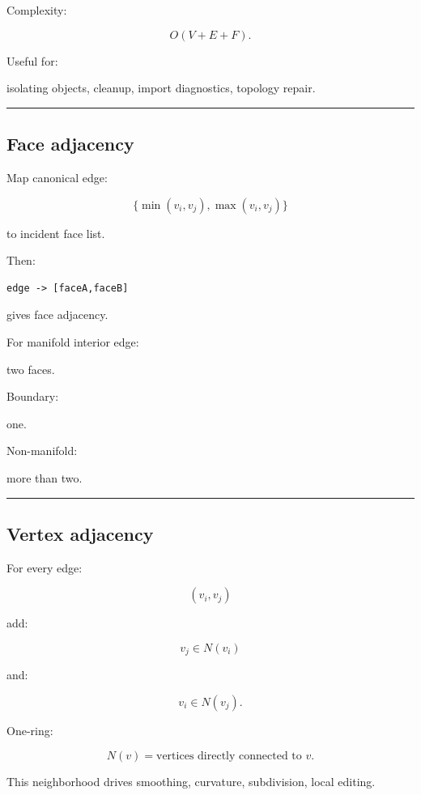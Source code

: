 Complexity:

\[
O(V+E+F).
\]

Useful for:

isolating objects, cleanup, import diagnostics, topology repair.

\begin{center}\rule{0.5\linewidth}{0.5pt}\end{center}

\subsection{Face adjacency}\label{04-visual-computing-ii-ch041-face-adjacency}

Map canonical edge:

\[
\{\min(v_i,v_j),\max(v_i,v_j)\}
\]

to incident face list.

Then:

\begin{verbatim}
edge -> [faceA,faceB]
\end{verbatim}

gives face adjacency.

For manifold interior edge:

two faces.

Boundary:

one.

Non-manifold:

more than two.

\begin{center}\rule{0.5\linewidth}{0.5pt}\end{center}

\subsection{Vertex adjacency}\label{04-visual-computing-ii-ch041-vertex-adjacency}

For every edge:

\[
(v_i,v_j)
\]

add:

\[
v_j\in N(v_i)
\]

and:

\[
v_i\in N(v_j).
\]

One-ring:

\[
\boxed{
N(v)
=
\text{vertices directly connected to }v.
}
\]

This neighborhood drives smoothing, curvature, subdivision, local editing.

